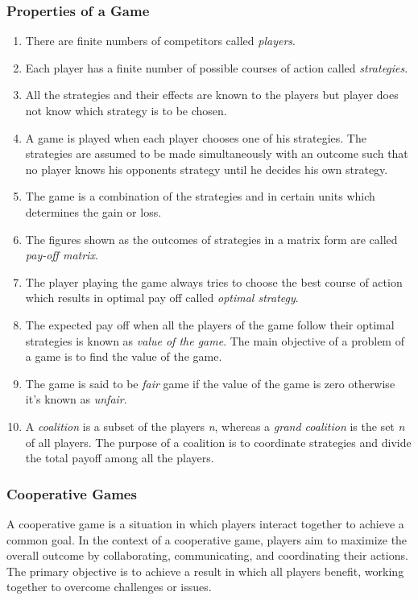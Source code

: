 \subsubsection{Properties of a Game}
\begin{enumerate}
    \item {There are finite numbers of competitors called \textit{players}.}
    \item {Each player has a finite number of possible courses of action called \textit{strategies}.}
    \item {All the strategies and their effects are known to the players but player does not know which
    strategy is to be chosen.}
    \item {A game is played when each player chooses one of his strategies. The strategies are assumed
    to be made simultaneously with an outcome such that no player knows his opponents strategy
    until he decides his own strategy.}
    \item {The game is a combination of the strategies and in certain units which determines the gain or
    loss.}
    \item {The figures shown as the outcomes of strategies in a matrix form are called \textit{pay-off matrix}.}
    \item {The player playing the game always tries to choose the best course of action which results in
    optimal pay off called \textit{optimal strategy}.}
    \item {The expected pay off when all the players of the game follow their optimal strategies is
    known as \textit{value of the game}. The main objective of a problem of a game is to find the value
    of the game.}
    \item {The game is said to be \textit{fair} game if the value of the game is zero otherwise it's known as \textit{unfair}.}
    \item {A \textit{coalition} is a subset of the players \textit{n}, whereas a \textit{grand coalition} is the
        set \textit{n} of all players. The purpose of a coalition is to coordinate strategies and divide the
        total payoff among all the players.}
\end{enumerate}


\subsubsection{Cooperative Games}
A cooperative game is a situation in which players interact together to achieve a common goal.
In the context of a cooperative game, players aim to maximize the overall outcome by collaborating, communicating, and coordinating their actions.
The primary objective is to achieve a result in which all players benefit, working together to overcome challenges or issues.


